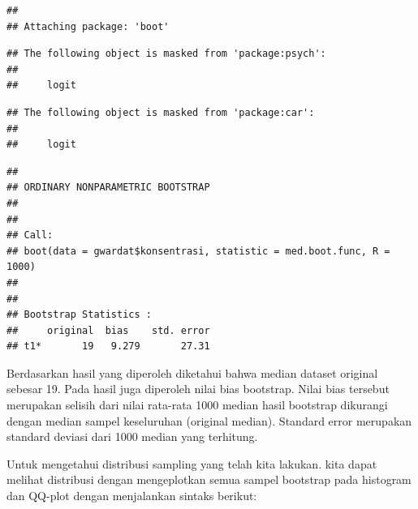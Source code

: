 \documentclass[]{book}
\newenvironment{Shaded}{\begin{snugshade}}{\end{snugshade}}
\newcommand{\KeywordTok}[1]{\textcolor[rgb]{0.13,0.29,0.53}{\textbf{#1}}}
\newcommand{\DataTypeTok}[1]{\textcolor[rgb]{0.13,0.29,0.53}{#1}}
\newcommand{\DecValTok}[1]{\textcolor[rgb]{0.00,0.00,0.81}{#1}}
\newcommand{\StringTok}[1]{\textcolor[rgb]{0.31,0.60,0.02}{#1}}
\newcommand{\CommentTok}[1]{\textcolor[rgb]{0.56,0.35,0.01}{\textit{#1}}}
\newcommand{\ControlFlowTok}[1]{\textcolor[rgb]{0.13,0.29,0.53}{\textbf{#1}}}
\newcommand{\OperatorTok}[1]{\textcolor[rgb]{0.81,0.36,0.00}{\textbf{#1}}}
\newcommand{\NormalTok}[1]{#1}
\begin{document}
\begin{verbatim}
## 
## Attaching package: 'boot'
\end{verbatim}

\begin{verbatim}
## The following object is masked from 'package:psych':
## 
##     logit
\end{verbatim}

\begin{verbatim}
## The following object is masked from 'package:car':
## 
##     logit
\end{verbatim}

\begin{Shaded}
\end{Shaded}

\begin{verbatim}
## 
## ORDINARY NONPARAMETRIC BOOTSTRAP
## 
## 
## Call:
## boot(data = gwardat$konsentrasi, statistic = med.boot.func, R = 1000)
## 
## 
## Bootstrap Statistics :
##     original  bias    std. error
## t1*       19   9.279       27.31
\end{verbatim}

Berdasarkan hasil yang diperoleh diketahui bahwa median dataset original
sebesar 19. Pada hasil juga diperoleh nilai bias bootstrap. Nilai bias
tersebut merupakan selisih dari nilai rata-rata 1000 median hasil
bootstrap dikurangi dengan median sampel keseluruhan (original median).
Standard error merupakan standard deviasi dari 1000 median yang
terhitung.

Untuk mengetahui distribusi sampling yang telah kita lakukan. kita dapat
melihat distribusi dengan mengeplotkan semua sampel bootstrap pada
histogram dan QQ-plot dengan menjalankan sintaks berikut:
\end{document}
